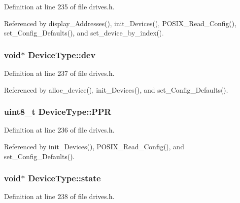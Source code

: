 Definition at line 235 of file drives.\+h.



Referenced by display\+\_\+\+Addresses(), init\+\_\+\+Devices(), P\+O\+S\+I\+X\+\_\+\+Read\+\_\+\+Config(), set\+\_\+\+Config\+\_\+\+Defaults(), and set\+\_\+device\+\_\+by\+\_\+index().

\subsubsection[{\texorpdfstring{dev}{dev}}]{\setlength{\rightskip}{0pt plus 5cm}void$\ast$ Device\+Type\+::dev}\hypertarget{structDeviceType_a59fc3b3cb45f8ee0cd1016bd64804d3b}{}\label{structDeviceType_a59fc3b3cb45f8ee0cd1016bd64804d3b}


Definition at line 237 of file drives.\+h.



Referenced by alloc\+\_\+device(), init\+\_\+\+Devices(), and set\+\_\+\+Config\+\_\+\+Defaults().

\subsubsection[{\texorpdfstring{P\+PR}{PPR}}]{\setlength{\rightskip}{0pt plus 5cm}uint8\+\_\+t Device\+Type\+::\+P\+PR}\hypertarget{structDeviceType_ae0e59c6c17582ff80bdab3f2010e8d57}{}\label{structDeviceType_ae0e59c6c17582ff80bdab3f2010e8d57}


Definition at line 236 of file drives.\+h.



Referenced by init\+\_\+\+Devices(), P\+O\+S\+I\+X\+\_\+\+Read\+\_\+\+Config(), and set\+\_\+\+Config\+\_\+\+Defaults().

\subsubsection[{\texorpdfstring{state}{state}}]{\setlength{\rightskip}{0pt plus 5cm}void$\ast$ Device\+Type\+::state}\hypertarget{structDeviceType_ad0fc43d63606bab6c259047e36512e08}{}\label{structDeviceType_ad0fc43d63606bab6c259047e36512e08}


Definition at line 238 of file drives.\+h.



